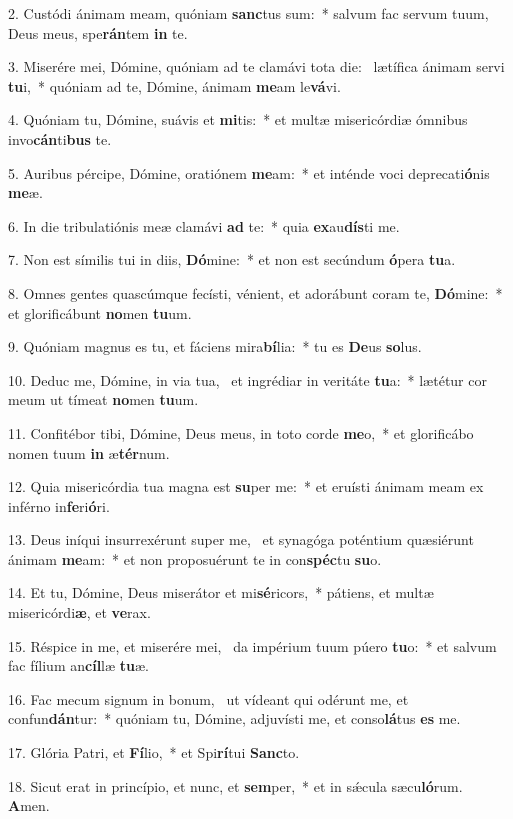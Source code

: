 2. Custódi ánimam meam, quóniam \textbf{sanc}tus sum:~*  salvum fac servum tuum, Deus meus, spe\textbf{rán}tem \textbf{in} te.\

3. Miserére mei, Dómine, quóniam ad te clamávi tota die: \dag\  lætífica ánimam servi \textbf{tu}i,~*  quóniam ad te, Dómine, ánimam \textbf{me}am le\textbf{vá}vi.\

4. Quóniam tu, Dómine, suávis et \textbf{mi}tis:~*  et multæ misericórdiæ ómnibus invo\textbf{cán}ti\textbf{bus} te.\

5. Auribus pércipe, Dómine, oratiónem \textbf{me}am:~*  et inténde voci deprecati\textbf{ó}nis \textbf{me}æ.\

6. In die tribulatiónis meæ clamávi \textbf{ad} te:~*  quia \textbf{ex}au\textbf{dís}ti me.\

7. Non est símilis tui in diis, \textbf{Dó}mine:~*  et non est secúndum \textbf{ó}pera \textbf{tu}a.\

8. Omnes gentes quascúmque fecísti, vénient, et adorábunt coram te, \textbf{Dó}mine:~*  et glorificábunt \textbf{no}men \textbf{tu}um.\

9. Quóniam magnus es tu, et fáciens mira\textbf{bí}lia:~*  tu es \textbf{De}us \textbf{so}lus.\

10. Deduc me, Dómine, in via tua, \dag\  et ingrédiar in veritáte \textbf{tu}a:~*  lætétur cor meum ut tímeat \textbf{no}men \textbf{tu}um.\

11. Confitébor tibi, Dómine, Deus meus, in toto corde \textbf{me}o,~*  et glorificábo nomen tuum \textbf{in} æ\textbf{tér}num.\

12. Quia misericórdia tua magna est \textbf{su}per me:~*  et eruísti ánimam meam ex inférno in\textbf{fe}ri\textbf{ó}ri.\

13. Deus iníqui insurrexérunt super me, \dag\  et synagóga poténtium quæsiérunt ánimam \textbf{me}am:~*  et non proposuérunt te in con\textbf{spéc}tu \textbf{su}o.\

14. Et tu, Dómine, Deus miserátor et mi\textbf{sé}ricors,~*  pátiens, et multæ misericórdi\textbf{æ}, et \textbf{ve}rax.\

15. Réspice in me, et miserére mei, \dag\  da impérium tuum púero \textbf{tu}o:~*  et salvum fac fílium an\textbf{cíl}læ \textbf{tu}æ.\

16. Fac mecum signum in bonum, \dag\  ut vídeant qui odérunt me, et confun\textbf{dán}tur:~*  quóniam tu, Dómine, adjuvísti me, et conso\textbf{lá}tus \textbf{es} me.\

17. Glória Patri, et \textbf{Fí}lio,~*  et Spi\textbf{rí}tui \textbf{Sanc}to.\

18. Sicut erat in princípio, et nunc, et \textbf{sem}per,~*  et in sǽcula sæcu\textbf{ló}rum. \textbf{A}men.\


